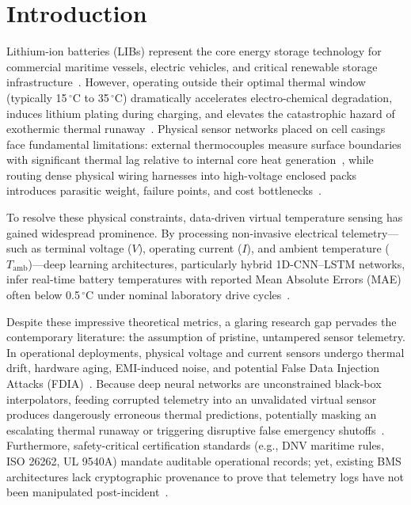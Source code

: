 \documentclass[conference]{IEEEtran}
\begin{document}
\section{Introduction}
Lithium-ion batteries (LIBs) represent the core energy storage technology for commercial maritime vessels, electric vehicles, and critical renewable storage infrastructure~\cite{bamati2024enhancing, zhao2024review}. However, operating outside their optimal thermal window (typically 15\,$^\circ$C to 35\,$^\circ$C) dramatically accelerates electro-chemical degradation, induces lithium plating during charging, and elevates the catastrophic hazard of exothermic thermal runaway~\cite{jiang2021data, zhao2024online}. Physical sensor networks placed on cell casings face fundamental limitations: external thermocouples measure surface boundaries with significant thermal lag relative to internal core heat generation~\cite{wang2021internal}, while routing dense physical wiring harnesses into high-voltage enclosed packs introduces parasitic weight, failure points, and cost bottlenecks~\cite{xie2023pid}.

To resolve these physical constraints, data-driven virtual temperature sensing has gained widespread prominence. By processing non-invasive electrical telemetry---such as terminal voltage ($V$), operating current ($I$), and ambient temperature ($T_{\text{amb}}$)---deep learning architectures, particularly hybrid 1D-CNN--LSTM networks, infer real-time battery temperatures with reported Mean Absolute Errors (MAE) often below 0.5\,$^\circ$C under nominal laboratory drive cycles~\cite{bamati2024enhancing, zhao2024online, qi2024frequency}.

Despite these impressive theoretical metrics, a glaring research gap pervades the contemporary literature: the assumption of pristine, untampered sensor telemetry. In operational deployments, physical voltage and current sensors undergo thermal drift, hardware aging, EMI-induced noise, and potential False Data Injection Attacks (FDIA)~\cite{zhang2023ai, zhao2024review}. Because deep neural networks are unconstrained black-box interpolators, feeding corrupted telemetry into an unvalidated virtual sensor produces dangerously erroneous thermal predictions, potentially masking an escalating thermal runaway or triggering disruptive false emergency shutoffs~\cite{jiang2021data, yu2024unsupervised}. Furthermore, safety-critical certification standards (e.g., DNV maritime rules, ISO 26262, UL 9540A) mandate auditable operational records; yet, existing BMS architectures lack cryptographic provenance to prove that telemetry logs have not been manipulated post-incident~\cite{lazzaro2024achieving, bhopale2024ensuring}.
\end{document}
